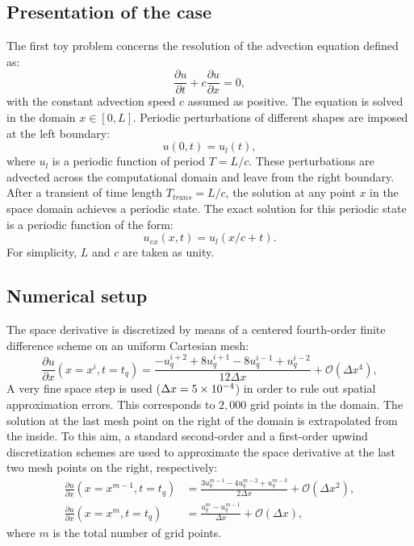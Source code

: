 
\subsection{Presentation of the case}

The first toy problem concerns the resolution of the
advection equation defined as:
\begin{equation}
  \label{eq:convection}
  \frac{\partial u}{\partial t} + c \frac{\partial u}{\partial x} = 0,
\end{equation}
with the constant advection speed $c$ assumed as positive. 
The equation is solved in the domain $x \in [0, L]$. 
Periodic perturbations of different shapes are imposed at the left boundary:
\begin{equation}
   u(0, t) = u_l (t),
\end{equation}
where $u_l$ is a periodic function of period $T=L/c$.
These perturbations are advected across the computational 
domain and leave from the right boundary. After a transient of time length $T_{trans}=L/c$, 
the solution at any point $x$ in the space domain achieves a periodic state. 
The exact solution for this periodic state is a periodic function of the form:
\begin{equation}
    u_{ex}(x,t)=u_l(x/c+t).
\end{equation}
For simplicity, $L$ and $c$ are taken as unity.

\subsection{Numerical setup}

The space derivative is discretized by means of a centered 
fourth-order finite difference scheme on an uniform Cartesian mesh:
\begin{equation}
    \frac{\partial u}{\partial x} (x = x^i, t=t_q) =
    \frac{-u^{i+2}_{q} + 8 u^{i+1}_{q} - 8 u^{i-1}_{q} + u^{i-2}_{q}}{12\Delta x}
    + \mathcal{O} (\Delta x^4),
    \label{eq:convection_center4}
\end{equation}
A very fine space step is used ($\Delta x=5\times 10^{-4}$) in order to rule 
out spatial approximation errors. This corresponds to $2,000$ grid points
in the domain. 
The solution at the last mesh 
point on the right of the domain is extrapolated 
from the inside. To this aim, a standard second-order 
and a first-order upwind discretization schemes
are used to approximate the space derivative at 
the last two mesh points on the right, respectively:
\begin{align}
    \frac{\partial u}{\partial x} (x = x^{m-1}, t=t_q) &=
    \frac{3 u^{m-1}_{q} - 4 u^{m-2}_{q} + u^{m-3}_{q}}{2\Delta x} + \mathcal{O} (\Delta x^2), \\
    \frac{\partial u}{\partial x} (x = x^m, t=t_q) &= 
    \frac{u^{m}_{q} - u^{m-1}_{q}}{\Delta x} + \mathcal{O} (\Delta x),
\label{eq:upwind_scheme}
\end{align}
where $m$ is the total number of grid points.

